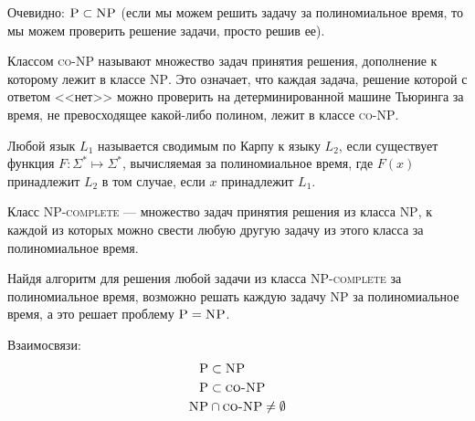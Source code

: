     \begin{Rem}
        Очевидно: $\textsc{P} \subset \textsc{NP}$ (если мы можем решить задачу за полиномиальное время, то мы можем проверить решение задачи, просто решив ее).
    \end{Rem}
    \begin{Def}
        Классом \textsc{co-NP} называют множество задач принятия решения, дополнение к которому лежит в классе \textsc{NP}. Это означает, что каждая задача, решение которой с ответом <<нет>> можно проверить на детерминированной машине Тьюринга за время, не превосходящее какой-либо полином, лежит в классе \textsc{co-NP}.
    \end{Def}
    
    
    \begin{Def}
        Любой язык $L_1$ называется сводимым по Карпу к языку $L_2$, если существует функция $F\colon \Sigma ^{*}\mapsto \Sigma ^{*}$, вычисляемая за полиномиальное время, где $F(x)$ принадлежит $L_2$ в том случае, если $x$ принадлежит $L_1$. 
    \end{Def}

    \begin{Def}
        Класс \textsc{NP-complete} --- множество задач принятия решения из класса \textsc{NP}, к каждой из которых можно свести $\textbf{любую}$ другую задачу из этого класса за полиномиальное время.
    \end{Def}
    \begin{Rem}
        Найдя алгоритм для решения любой задачи из класса \textsc{NP-complete} за полиномиальное время, возможно решать каждую задачу \textsc{NP} за полиномиальное время, а это решает проблему $\textsc{P} = \textsc{NP}$.
    \end{Rem}
    
    
    \begin{Rem}
        Взаимосвязи:
        \begin{align*}
            \textsc{P} &\subset \textsc{NP} \\
            \textsc{P} &\subset \textsc{co-NP} \\
            \textsc{NP} &\cap \textsc{co-NP} \neq \emptyset
        \end{align*}
    \end{Rem}
    
